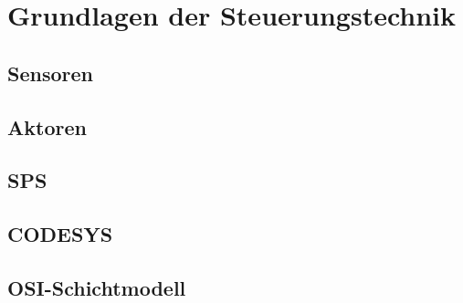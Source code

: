 \section{Grundlagen der Steuerungstechnik}
\subsection{Sensoren}

\subsection{Aktoren}

\subsection{SPS}

\subsection{CODESYS}

\subsection{OSI-Schichtmodell}